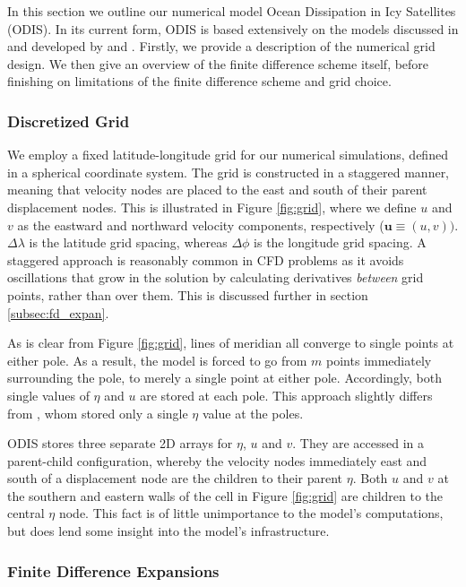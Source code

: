 In this section we outline our numerical model Ocean Dissipation in Icy Satellites (ODIS). In its current form, ODIS is based extensively on the models discussed in and developed by \citet{zahel1973diurnalk,zahel1978influence} and \citet{sears1994tidal,sears1995tidal}. Firstly, we provide a description of the numerical grid design. We then give an overview of the finite difference scheme itself, before finishing on limitations of the finite difference scheme and grid choice.

\subsubsection{Discretized Grid \label{subsec:grid}}

We employ a fixed latitude-longitude grid for our numerical simulations, defined in a spherical coordinate system. The grid is constructed in a staggered manner, meaning that velocity nodes are placed to the east and south of their parent displacement nodes. This is illustrated in Figure \ref{fig:grid}, where we define $u$ and $v$ as the eastward and northward velocity components, respectively ($\bm{u} \equiv \left(u,v\right))$. $\Delta \lambda$ is the latitude grid spacing, whereas $\Delta \phi$ is the longitude grid spacing. A staggered approach is reasonably common in CFD problems as it avoids oscillations that grow in the solution by calculating derivatives \textit{between} grid points, rather than over them. This is discussed further in section \ref{subsec:fd_expan}.

As is clear from Figure \ref{fig:grid}, lines of meridian all converge to single points at either pole. As a result, the model is forced to go from $m$ points immediately surrounding the pole, to merely a single point at either pole. Accordingly, both single values of $\eta$ and $u$ are stored at each pole. This approach slightly differs from \citet{sears1995tidal}, whom stored only a single $\eta$ value at the poles.

ODIS stores three separate 2D arrays for $\eta$, $u$ and $v$. They are accessed in a parent-child configuration, whereby the velocity nodes immediately east and south of a displacement node are the children to their parent $\eta$. Both $u$ and $v$ at the southern and eastern walls of the cell in Figure \ref{fig:grid} are children to the central $\eta$ node. This fact is of little unimportance to the model's computations, but does lend some insight into the model's infrastructure.

\subsubsection{Finite Difference Expansions \label{subsec:fd_expan}}

